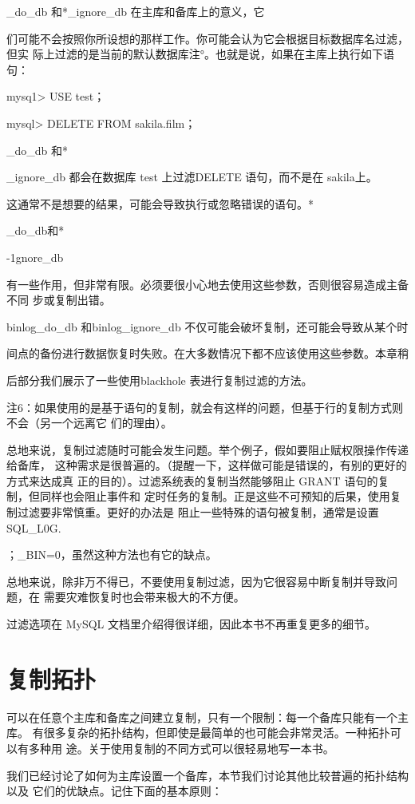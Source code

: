 \_do\_db 和*\_ignore\_db 在主库和备库上的意义，它

们可能不会按照你所设想的那样工作。你可能会认为它会根据目标数据库名过滤，但实
际上过滤的是当前的默认数据库注°。也就是说，如果在主库上执行如下语句：

mysq1> USE test；

mysql> DELETE FROM sakila.film；

\_do\_db 和*

\_ignore\_db 都会在数据库 test 上过滤DELETE 语句，而不是在 sakila上。

这通常不是想要的结果，可能会导致执行或忽略错误的语句。*

\_do\_db和*

-1gnore\_db

有一些作用，但非常有限。必须要很小心地去使用这些参数，否则很容易造成主备不同
步或复制出错。

binlog\_do\_db 和binlog\_ignore\_db 不仅可能会破坏复制，还可能会导致从某个时

间点的备份进行数据恢复时失败。在大多数情况下都不应该使用这些参数。本章稍

后部分我们展示了一些使用blackhole 表进行复制过滤的方法。

注6：如果使用的是基于语句的复制，就会有这样的问题，但基于行的复制方式则不会（另一个远离它
们的理由）。

总地来说，复制过滤随时可能会发生问题。举个例子，假如要阻止赋权限操作传递给备库，
这种需求是很普遍的。（提醒一下，这样做可能是错误的，有别的更好的方式来达成真
正的目的）。过滤系统表的复制当然能够阻止 GRANT 语句的复制，但同样也会阻止事件和
定时任务的复制。正是这些不可预知的后果，使用复制过滤要非常慎重。更好的办法是
阻止一些特殊的语句被复制，通常是设置SQL\_L0G.

；\_BIN=0，虽然这种方法也有它的缺点。

总地来说，除非万不得已，不要使用复制过滤，因为它很容易中断复制并导致问题，在
需要灾难恢复时也会带来极大的不方便。

过滤选项在 MySQL 文档里介绍得很详细，因此本书不再重复更多的细节。

\section{复制拓扑}
可以在任意个主库和备库之间建立复制，只有一个限制：每一个备库只能有一个主库。
有很多复杂的拓扑结构，但即使是最简单的也可能会非常灵活。一种拓扑可以有多种用
途。关于使用复制的不同方式可以很轻易地写一本书。

我们已经讨论了如何为主库设置一个备库，本节我们讨论其他比较普遍的拓扑结构以及
它们的优缺点。记住下面的基本原则：

